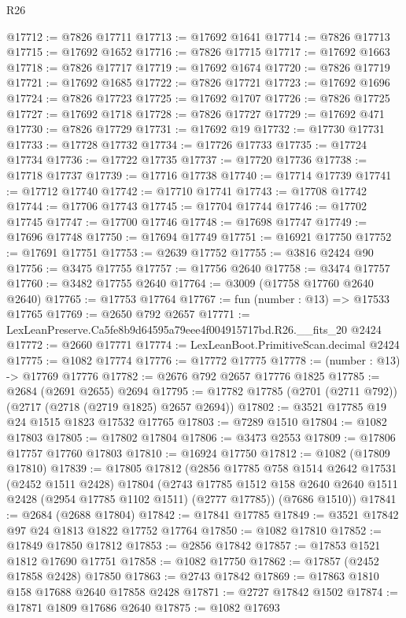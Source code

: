 \begin{lexlean}{R26}
\begin{coremodule}
@17712 := @7826 @17711
@17713 := @17692 @1641
@17714 := @7826 @17713
@17715 := @17692 @1652
@17716 := @7826 @17715
@17717 := @17692 @1663
@17718 := @7826 @17717
@17719 := @17692 @1674
@17720 := @7826 @17719
@17721 := @17692 @1685
@17722 := @7826 @17721
@17723 := @17692 @1696
@17724 := @7826 @17723
@17725 := @17692 @1707
@17726 := @7826 @17725
@17727 := @17692 @1718
@17728 := @7826 @17727
@17729 := @17692 @471
@17730 := @7826 @17729
@17731 := @17692 @19
@17732 := @17730 @17731
@17733 := @17728 @17732
@17734 := @17726 @17733
@17735 := @17724 @17734
@17736 := @17722 @17735
@17737 := @17720 @17736
@17738 := @17718 @17737
@17739 := @17716 @17738
@17740 := @17714 @17739
@17741 := @17712 @17740
@17742 := @17710 @17741
@17743 := @17708 @17742
@17744 := @17706 @17743
@17745 := @17704 @17744
@17746 := @17702 @17745
@17747 := @17700 @17746
@17748 := @17698 @17747
@17749 := @17696 @17748
@17750 := @17694 @17749
@17751 := @16921 @17750
@17752 := @17691 @17751
@17753 := @2639 @17752
@17755 := @3816 @2424 @90
@17756 := @3475 @17755
@17757 := @17756 @2640
@17758 := @3474 @17757
@17760 := @3482 @17755 @2640
@17764 := @3009 (@17758 @17760 @2640 @2640)
@17765 := @17753 @17764
@17767 := fun (number : @13) => @17533 @17765
@17769 := @2650 @792 @2657
@17771 := LexLeanPreserve.Ca5fe8b9d64595a79eee4f004915717bd.R26.__fits_20 @2424
@17772 := @2660 @17771
@17774 := LexLeanBoot.PrimitiveScan.decimal @2424
@17775 := @1082 @17774
@17776 := @17772 @17775
@17778 := (number : @13) -> @17769 @17776
@17782 := @2676 @792 @2657 @17776 @1825
@17785 := @2684 (@2691 @2655) @2694
@17795 := @17782 @17785 (@2701 (@2711 @792)) (@2717 (@2718 (@2719 @1825) @2657 @2694))
@17802 := @3521 @17785 @19 @24 @1515 @1823 @17532 @17765
@17803 := @7289 @1510
@17804 := @1082 @17803
@17805 := @17802 @17804
@17806 := @3473 @2553
@17809 := @17806 @17757 @17760 @17803
@17810 := @16924 @17750
@17812 := @1082 (@17809 @17810)
@17839 := @17805
    @17812
    (@2856
      @17785
      @758
      @1514
      @2642
      @17531
      (@2452 @1511 @2428)
      @17804
      (@2743 @17785 @1512 @158 @2640 @2640 @1511 @2428 (@2954 @17785 @1102 @1511) (@2777 @17785))
      (@7686 @1510))
@17841 := @2684 (@2688 @17804)
@17842 := @17841 @17785
@17849 := @3521 @17842 @97 @24 @1813 @1822 @17752 @17764
@17850 := @1082 @17810
@17852 := @17849 @17850 @17812
@17853 := @2856 @17842
@17857 := @17853 @1521 @1812 @17690 @17751
@17858 := @1082 @17750
@17862 := @17857 (@2452 @17858 @2428) @17850
@17863 := @2743 @17842
@17869 := @17863 @1810 @158 @17688 @2640 @17858 @2428
@17871 := @2727 @17842 @1502
@17874 := @17871 @1809 @17686 @2640
@17875 := @1082 @17693

\end{coremodule}
\end{lexlean}
